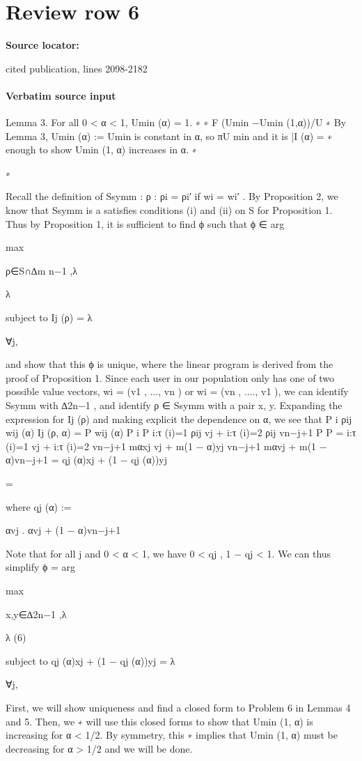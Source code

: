 \documentclass[10pt]{article}
\begin{document}
\section*{Review row 6}
\textbf{Source locator:} {\footnotesize\raggedright cited publication, lines 2098-\allowbreak{}2182\par}
\paragraph{Verbatim source input}
\begin{ReviewVerbatim}
Lemma 3. For all 0 < α < 1, Umin
(α) = 1.
∗
∗
F
(Umin −Umin (1,α))/U ∗
By Lemma 3, Umin
(α) := Umin
is constant in α, so πU
min and it is
|I (α) =
∗
enough to show Umin (1, α) increases in α.
∗

∗

Recall the definition of Ssymm :
{ρ : ρi = ρi′ if wi = wi′ }.
By Proposition 2, we know that Ssymm is a satisfies conditions (i) and (ii) on S for Proposition 1.
Thus by Proposition 1, it is sufficient to find ϕ such that
ϕ ∈ arg

max

ρ∈S∩∆m
n−1 ,λ

λ

subject to Ij (ρ) = λ

∀j,

and show that this ϕ is unique, where the linear program is derived from the proof of Proposition 1.
Since each user in our population only has one of two possible value vectors, wi = (v1 , ..., vn )
or wi = (vn , ...., v1 ), we can identify Ssymm with ∆2n−1 , and identify ρ ∈ Ssymm with a pair x, y.
Expanding the expression for Ij (ρ) and making explicit the dependence on α, we see that
P
i ρij wij (α)
Ij (ρ, α) = P
wij (α)
P i
P
i:τ (i)=1 ρij vj +
i:τ (i)=2 ρij vn−j+1
P
P
=
i:τ (i)=1 vj +
i:τ (i)=2 vn−j+1
mαxj vj + m(1 − α)yj vn−j+1
mαvj + m(1 − α)vn−j+1
= qj (α)xj + (1 − qj (α))yj

=

where
qj (α) :=

αvj
.
αvj + (1 − α)vn−j+1

Note that for all j and 0 < α < 1, we have 0 < qj , 1 − qj < 1. We can thus simplify
ϕ = arg

max

x,y∈∆2n−1 ,λ

λ
(6)

subject to qj (α)xj + (1 − qj (α))yj = λ

∀j,

First, we will show uniqueness and find a closed form to Problem 6 in Lemmas 4 and 5. Then, we
∗
will use this closed forms to show that Umin
(1, α) is increasing for α < 1/2. By symmetry, this
∗
implies that Umin
(1, α) must be decreasing for α > 1/2 and we will be done.
\end{ReviewVerbatim}
\end{document}
